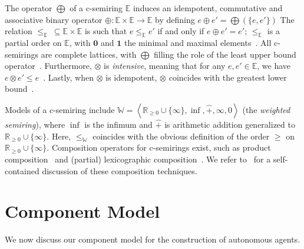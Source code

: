 \documentclass[a4paper]{article}
\newcommand{\angl}[1]{\left\langle#1\right\rangle}
\newcommand{\csbot}{\mathbf{0}}
\newcommand{\cstop}{\mathbf{1}}
\newcommand{\abscsemiring}{\mathbb{E}}
\newcommand{\wcsemiring}{\mathbb{W}}
\theoremstyle{definition}
\begin{document}
The operator $\bigoplus$ of a c-semiring $\abscsemiring$ induces an idempotent, commutative and associative binary operator $\oplus: \abscsemiring \times \abscsemiring \to \abscsemiring$ by defining $e \oplus e' = \bigoplus (\{ e, e' \})$
The relation $\leq_{\abscsemiring}\ \subseteq \abscsemiring \times \abscsemiring$ is such that $e \leq_{\abscsemiring} e'$ if and only if $e \oplus e' = e'$; $\leq_{\abscsemiring}$ is a partial order on $\abscsemiring$, with $\csbot$ and $\cstop$ the minimal and maximal elements~\cite{bistarelli-2004}. All c-semirings are complete lattices, with $\bigoplus$ filling the role of the least upper bound operator~\cite{bistarelli-2004}. Furthermore, $\otimes$ is \emph{intensive}, meaning that for any $e, e' \in \abscsemiring$, we have $e \otimes e' \leq e$~\cite{bistarelli-2004}. Lastly, when $\otimes$ is idempotent, $\otimes$ coincides with the greatest lower bound~\cite{bistarelli-2004}. 

Models of a c-semiring include $\wcsemiring = \angl{\mathbb{R}_{\geq 0} \cup \{ \infty \}, \inf, \hat{+}, \infty, 0}$ (the \emph{weighted semiring}), where $\inf$ is the infimum and $\hat{+}$ is arithmetic addition generalized to $\mathbb{R}_{\geq 0} \cup \{ \infty \}$. Here, $\leq_{\wcsemiring}$ coincides with the obvious definition of the order $\geq$ on $\mathbb{R}_{\geq 0} \cup \{ \infty \}$. Composition operators for c-semirings exist, such as product composition~\cite{bistarelli-montanari-rossi-1997} and (partial) lexicographic composition~\cite{gadducci-holzl-monreale-wirsing-2013}. We refer to~\cite{kappe-arbab-talcott-2016} for a self-contained discussion of these composition techniques.

\section{Component Model}%
\label{section:component-model}

We now discuss our component model for the construction of autonomous agents. 
\end{document}
